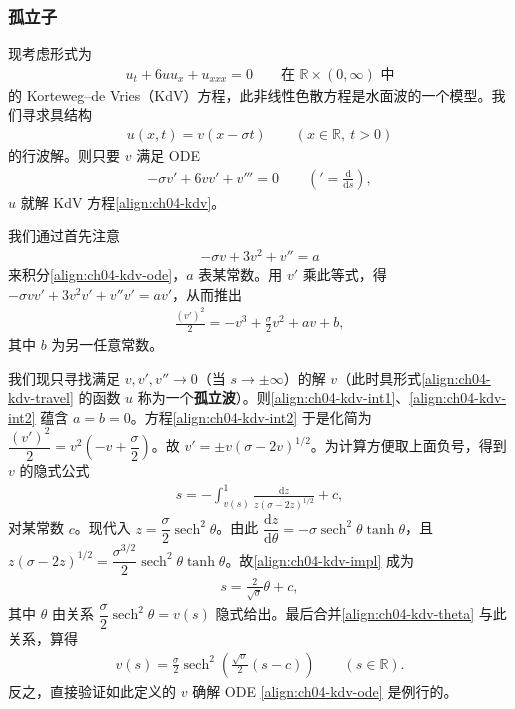 \documentclass[../../main.tex]{subfiles}
\begin{document}
\subsubsection{孤立子}

现考虑形式为
\begin{align}\label{align:ch04-kdv}
u_t+6uu_x+u_{xxx}=0 \qquad\text{在 }\mathbb{R}\times(0,\infty)\text{ 中}
\end{align}
的 Korteweg--de Vries（KdV）方程，此非线性色散方程是水面波的一个模型。我们寻求具结构
\begin{align}\label{align:ch04-kdv-travel}
u(x,t)=v(x-\sigma t) \qquad(x\in\mathbb{R},\ t>0)
\end{align}
的行波解。则只要 $v$ 满足 ODE
\begin{align}\label{align:ch04-kdv-ode}
-\sigma v'+6vv'+v'''=0 \qquad('=\tfrac{\mathrm{d}}{\mathrm{d}s}),
\end{align}
$u$ 就解 KdV 方程\eqref{align:ch04-kdv}。

我们通过首先注意
\begin{align}\label{align:ch04-kdv-int1}
-\sigma v+3v^2+v''=a
\end{align}
来积分\eqref{align:ch04-kdv-ode}，$a$ 表某常数。用 $v'$ 乘此等式，得 $-\sigma vv'+3v^2v'+v''v'=av'$，从而推出
\begin{align}\label{align:ch04-kdv-int2}
\frac{(v')^2}{2}=-v^3+\frac{\sigma}{2}v^2+av+b,
\end{align}
其中 $b$ 为另一任意常数。

我们现只寻找满足 $v,v',v''\to 0$（当 $s\to\pm\infty$）的解 $v$（此时具形式\eqref{align:ch04-kdv-travel} 的函数 $u$ 称为一个\textbf{孤立波}）。则\eqref{align:ch04-kdv-int1}、\eqref{align:ch04-kdv-int2} 蕴含 $a=b=0$。方程\eqref{align:ch04-kdv-int2} 于是化简为 $\dfrac{(v')^2}{2}=v^2\left(-v+\dfrac{\sigma}{2}\right)$。故 $v'=\pm v(\sigma-2v)^{1/2}$。为计算方便取上面负号，得到 $v$ 的隐式公式
\begin{align}\label{align:ch04-kdv-impl}
s=-\int_{v(s)}^1\frac{\mathrm{d}z}{z(\sigma-2z)^{1/2}}+c,
\end{align}
对某常数 $c$。现代入 $z=\dfrac{\sigma}{2}\operatorname{sech}^2\theta$。由此 $\dfrac{\mathrm{d}z}{\mathrm{d}\theta}=-\sigma\operatorname{sech}^2\theta\tanh\theta$，且 $z(\sigma-2z)^{1/2}=\dfrac{\sigma^{3/2}}{2}\operatorname{sech}^2\theta\tanh\theta$。故\eqref{align:ch04-kdv-impl} 成为
\begin{align}\label{align:ch04-kdv-theta}
s=\frac{2}{\sqrt{\sigma}}\theta+c,
\end{align}
其中 $\theta$ 由关系 $\dfrac{\sigma}{2}\operatorname{sech}^2\theta=v(s)$ 隐式给出。最后合并\eqref{align:ch04-kdv-theta} 与此关系，算得
\begin{align*}
v(s)=\frac{\sigma}{2}\operatorname{sech}^2\!\left(\frac{\sqrt{\sigma}}{2}(s-c)\right) \qquad(s\in\mathbb{R}).
\end{align*}
反之，直接验证如此定义的 $v$ 确解 ODE \eqref{align:ch04-kdv-ode} 是例行的。
\end{document}
